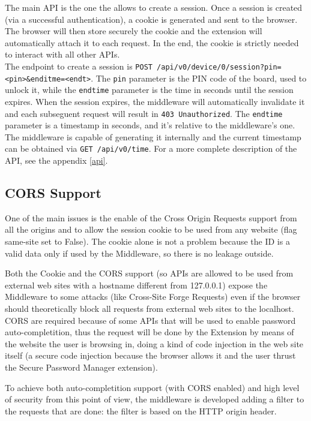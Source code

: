The main API is the one the allows to create a session. Once a session is created (via a successful authentication), a cookie is generated and sent to the browser. The browser will then store securely the cookie and the extension will automatically attach it to each request. In the end, the cookie is strictly needed to interact with all other APIs.\\

The endpoint to create a session is \texttt{POST /api/v0/device/0/session?pin=<pin>\&enditme=<endt>}. The \texttt{pin} parameter is the PIN code of the board, used to unlock it, while the \texttt{endtime} parameter is the time in seconds until the session expires. When the session expires, the middleware will automatically invalidate it and each subseguent request will result in \texttt{403 Unauthorized}. The \texttt{endtime} parameter is a timestamp in seconds, and it's relative to the middleware's one. The middleware is capable of generating it internally and the current timestamp can be obtained via \texttt{GET /api/v0/time}. For a more complete description of the API, see the appendix \ref{api}.

\subsection{CORS Support}
One of the main issues is the enable of the Cross Origin Requests support from all the origins and to allow the session cookie to be used from any website (flag same-site set to False). The cookie alone is not a problem because the ID is a valid data only if used by the Middleware, so there is no leakage outside. \bigskip

Both the Cookie and the CORS support (so APIs are allowed to be used from external web sites with a hostname different from 127.0.0.1) expose the Middleware to some attacks (like Cross-Site Forge Requests) even if the browser should theoretically block all requests from external web sites to the localhost. CORS are required because of some APIs that will be used to enable password auto-completition, thus the request will be done by the Extension by means of the website the user is browsing in, doing a kind of code injection in the web site itself (a secure code injection because the browser allows it and the user thrust the Secure Password Manager extension). \bigskip

To achieve both auto-completition support (with CORS enabled) and high level of security from this point of view, the middleware is developed adding a filter to the requests that are done: the filter is based on the HTTP origin header. \bigskip

